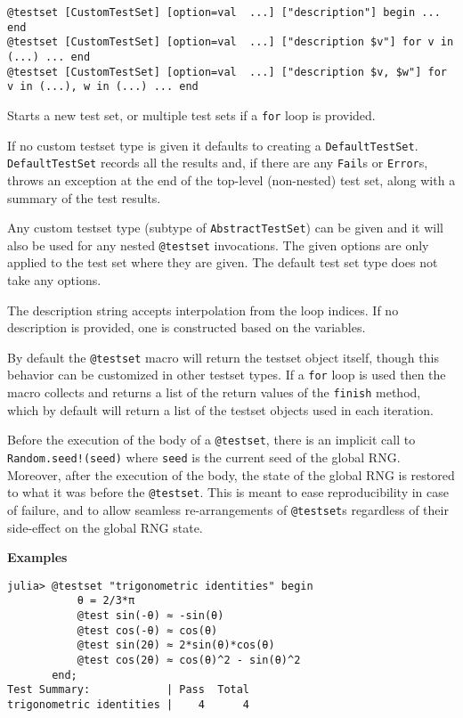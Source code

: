 \begin{adjustwidth}{2em}{0pt}


\begin{verbatim}
@testset [CustomTestSet] [option=val  ...] ["description"] begin ... end
@testset [CustomTestSet] [option=val  ...] ["description $v"] for v in (...) ... end
@testset [CustomTestSet] [option=val  ...] ["description $v, $w"] for v in (...), w in (...) ... end
\end{verbatim}

Starts a new test set, or multiple test sets if a \texttt{for} loop is provided.

If no custom testset type is given it defaults to creating a \texttt{DefaultTestSet}. \texttt{DefaultTestSet} records all the results and, if there are any \texttt{Fail}s or \texttt{Error}s, throws an exception at the end of the top-level (non-nested) test set, along with a summary of the test results.

Any custom testset type (subtype of \texttt{AbstractTestSet}) can be given and it will also be used for any nested \texttt{@testset} invocations. The given options are only applied to the test set where they are given. The default test set type does not take any options.

The description string accepts interpolation from the loop indices. If no description is provided, one is constructed based on the variables.

By default the \texttt{@testset} macro will return the testset object itself, though this behavior can be customized in other testset types. If a \texttt{for} loop is used then the macro collects and returns a list of the return values of the \texttt{finish} method, which by default will return a list of the testset objects used in each iteration.

Before the execution of the body of a \texttt{@testset}, there is an implicit call to \texttt{Random.seed!(seed)} where \texttt{seed} is the current seed of the global RNG. Moreover, after the execution of the body, the state of the global RNG is restored to what it was before the \texttt{@testset}. This is meant to ease reproducibility in case of failure, and to allow seamless re-arrangements of \texttt{@testset}s regardless of their side-effect on the global RNG state.

\textbf{Examples}


\begin{verbatim}
julia> @testset "trigonometric identities" begin
           θ = 2/3*π
           @test sin(-θ) ≈ -sin(θ)
           @test cos(-θ) ≈ cos(θ)
           @test sin(2θ) ≈ 2*sin(θ)*cos(θ)
           @test cos(2θ) ≈ cos(θ)^2 - sin(θ)^2
       end;
Test Summary:            | Pass  Total
trigonometric identities |    4      4
\end{verbatim}



\end{adjustwidth}

